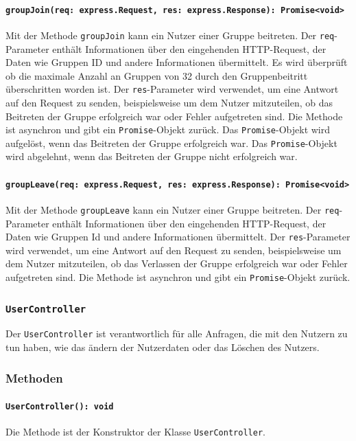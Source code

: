 \documentclass{entwurfsheft}
\begin{document}
\begin{sloppypar}
\paragraph{\texttt{groupJoin(req: express.Request, res: express.Response): Promise<void>\\}}
Mit der Methode \texttt{groupJoin} kann ein Nutzer einer Gruppe beitreten. Der \texttt{req}-Parameter enthält Informationen über den eingehenden HTTP-Request, der Daten wie Gruppen ID und andere Informationen übermittelt. Es wird überprüft ob die maximale Anzahl an Gruppen von 32 durch den Gruppenbeitritt überschritten worden ist. Der \texttt{res}-Parameter wird verwendet, um eine Antwort auf den Request zu senden, beispielsweise um dem Nutzer mitzuteilen, ob das Beitreten der Gruppe erfolgreich war oder Fehler aufgetreten sind.
Die Methode ist asynchron und gibt ein \texttt{Promise}-Objekt zurück. Das \texttt{Promise}-Objekt wird aufgelöst, wenn das Beitreten der Gruppe erfolgreich war. Das \texttt{Promise}-Objekt wird abgelehnt, wenn das Beitreten der Gruppe nicht erfolgreich war.
\paragraph{\texttt{groupLeave(req: express.Request, res: express.Response): Promise<void>\\}}
Mit der Methode \texttt{groupLeave} kann ein Nutzer einer Gruppe beitreten. Der \texttt{req}-Parameter enthält Informationen über den eingehenden HTTP-Request, der Daten wie Gruppen Id und andere Informationen übermittelt. Der \texttt{res}-Parameter wird verwendet, um eine Antwort auf den Request zu senden, beispielsweise um dem Nutzer mitzuteilen, ob das Verlassen der Gruppe erfolgreich war oder Fehler aufgetreten sind.
Die Methode ist asynchron und gibt ein \texttt{Promise}-Objekt zurück.

\subsubsection{\texttt{UserController}}\label{sec:UserController}
Der \texttt{UserController} ist verantwortlich für alle Anfragen, die mit den Nutzern zu tun haben, wie das ändern der Nutzerdaten oder das Löschen des Nutzers.
\subsubsection*{Methoden}
\paragraph{\texttt{UserController(): void}}
Die Methode ist der Konstruktor der Klasse \texttt{UserController}.

\end{sloppypar}
\end{document}
